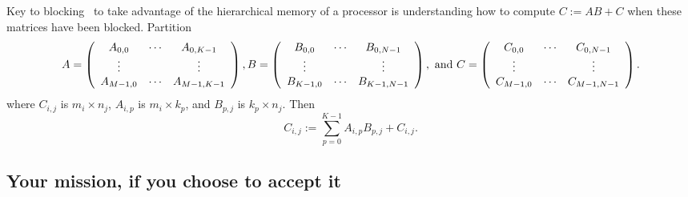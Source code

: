Key to blocking \Gemm\ to take advantage of the hierarchical memory of
a processor is understanding how to compute $ C := A B + C $ when
these matrices have been blocked.  Partition
{\footnotesize%
\[
A = 
\left( \begin{array}{c c c c}
A_{0,0} & \cdots & A_{0,K-1} \\
\vdots &  & \vdots \\
A_{M-1,0} & \cdots & A_{M-1,K-1} \\
\end{array}
\right),
B = 
\left( \begin{array}{c c c c}
B_{0,0} & \cdots & B_{0,N-1} \\
\vdots &  & \vdots \\
B_{K-1,0} & \cdots & B_{K-1,N-1} \\
\end{array}
\right), \mbox{~and~}
C = 
\left( \begin{array}{c c c c}
C_{0,0} & \cdots & C_{0,N-1} \\
\vdots &  & \vdots \\
C_{M-1,0} & \cdots & C_{M-1,N-1} \\
\end{array}
\right).
\]%
}
where $ C_{i,j} $ is $ m_i \times n_j
$, $ A_{i,p} $ is $ m_i \times k_p
$, and $ B_{p,j} $ is $ k_p \times n_j
$.
Then
\[
C_{i,j} := \sum_{p=0}^{K-1} A_{i,p} B_{p,j} + C_{i,j}.
\]

\subsection{Your mission, if you choose to accept it}